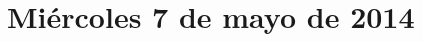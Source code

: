 \documentclass[12pt,spanish]{article}
\begin{document}
  \thispagestyle{empty}
  \pagestyle{empty}
  \section*{Miércoles 7 de mayo de 2014}

  \begin{certamen}[start=0]
    \item
      
      \newpage
    \item
      
      \newpage
  \end{certamen}
\end{document}
